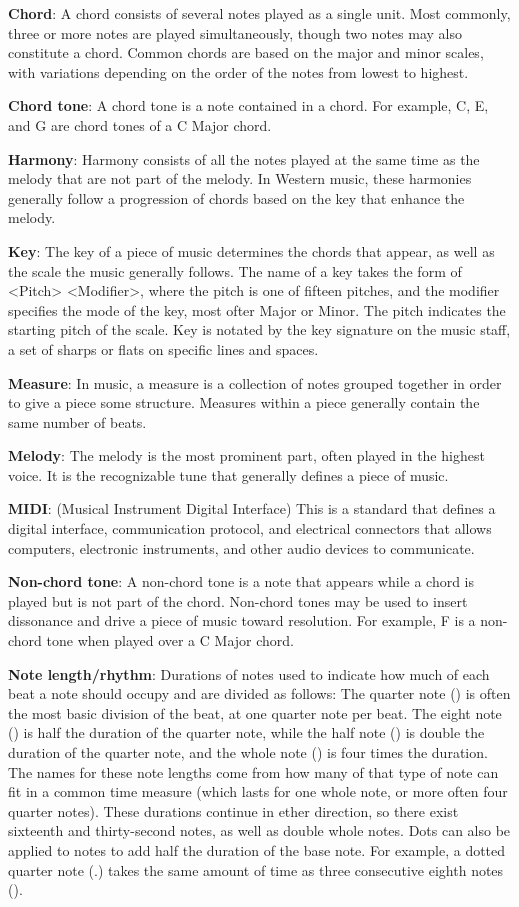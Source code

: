 \textbf{Chord}: A chord consists of several notes played as a single unit.
Most commonly, three or more notes are played simultaneously, though two notes may also constitute a chord.
Common chords are based on the major and minor scales, with variations depending on the order of the notes from lowest to highest.

\textbf{Chord tone}: A chord tone is a note contained in a chord.
For example, C, E, and G are chord tones of a C Major chord.

\textbf{Harmony}: Harmony consists of all the notes played at the same time as the melody that are not part of the melody.
In Western music, these harmonies generally follow a progression of chords based on the key that enhance the melody.

\textbf{Key}: The key of a piece of music determines the chords that appear, as well as the scale the music generally follows.
The name of a key takes the form of <Pitch> <Modifier>, where the pitch is one of fifteen pitches, and the modifier specifies the mode of the key, most ofter Major or Minor.
The pitch indicates the starting pitch of the scale.
Key is notated by the key signature on the music staff, a set of sharps or flats on specific lines and spaces.

\textbf{Measure}: In music, a measure is a collection of notes grouped together in order to give a piece some structure.
Measures within a piece generally contain the same number of beats.

\textbf{Melody}: The melody is the most prominent part, often played in the highest voice.
It is the recognizable tune that generally defines a piece of music.

\textbf{MIDI}: (Musical Instrument Digital Interface) This is a standard that defines a digital interface, communication protocol, and electrical connectors that allows computers, electronic instruments, and other audio devices to communicate.

\textbf{Non-chord tone}: A non-chord tone is a note that appears while a chord is played but is not part of the chord.
Non-chord tones may be used to insert dissonance and drive a piece of music toward resolution.
For example, F is a non-chord tone when played over a C Major chord.

\textbf{Note length/rhythm}: Durations of notes used to indicate how much of each beat a note should occupy and are divided as follows:
The quarter note (\quarternote) is often the most basic division of the beat, at one quarter note per beat.
The eight note (\eighthnote) is half the duration of the quarter note, while the half note (\halfnote) is double the duration of the quarter note, and the whole note (\fullnote) is four times the duration.
The names for these note lengths come from how many of that type of note can fit in a common time measure (which lasts for one whole note, or more often four quarter notes).
These durations continue in ether direction, so there exist sixteenth and thirty-second notes, as well as double whole notes.
Dots can also be applied to notes to add half the duration of the base note.
For example, a dotted quarter note (\quarternote.) takes the same amount of time as three consecutive eighth notes (\eighthnote \eighthnote \eighthnote).


